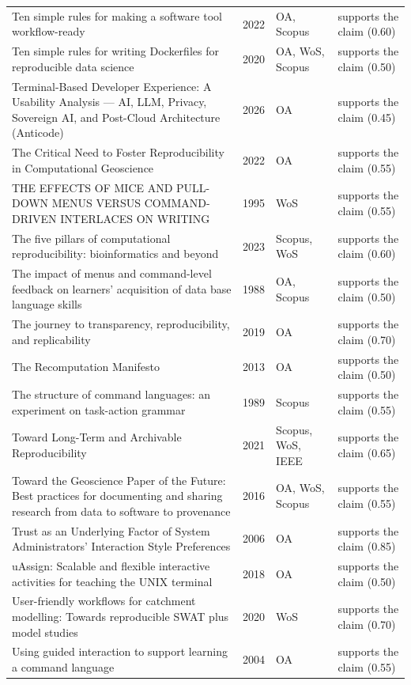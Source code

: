 \begin{longtable}{@{}%
  >{\raggedright\arraybackslash}p{}c%
  >{\raggedright\arraybackslash}p{}%
  >{\raggedright\arraybackslash}p{}@{}}
Ten simple rules for making a software tool workflow-ready & 2022 & OA, Scopus & supports the claim (0.60) \\
Ten simple rules for writing Dockerfiles for reproducible data science & 2020 & OA, WoS, Scopus & supports the claim (0.50) \\
Terminal-Based Developer Experience: A Usability Analysis --- AI, LLM, Privacy, Sovereign AI, and Post-Cloud Architecture (Anticode) & 2026 & OA & supports the claim (0.45) \\
The Critical Need to Foster Reproducibility in Computational Geoscience & 2022 & OA & supports the claim (0.55) \\
THE EFFECTS OF MICE AND PULL-DOWN MENUS VERSUS COMMAND-DRIVEN INTERLACES ON WRITING & 1995 & WoS & supports the claim (0.55) \\
The five pillars of computational reproducibility: bioinformatics and beyond & 2023 & Scopus, WoS & supports the claim (0.60) \\
The impact of menus and command-level feedback on learners' acquisition of data base language skills & 1988 & OA, Scopus & supports the claim (0.50) \\
The journey to transparency, reproducibility, and replicability & 2019 & OA & supports the claim (0.70) \\
The Recomputation Manifesto & 2013 & OA & supports the claim (0.50) \\
The structure of command languages: an experiment on task-action grammar & 1989 & Scopus & supports the claim (0.55) \\
Toward Long-Term and Archivable Reproducibility & 2021 & Scopus, WoS, IEEE & supports the claim (0.65) \\
Toward the Geoscience Paper of the Future: Best practices for documenting and sharing research from data to software to provenance & 2016 & OA, WoS, Scopus & supports the claim (0.55) \\
Trust as an Underlying Factor of System Administrators' Interaction Style Preferences & 2006 & OA & supports the claim (0.85) \\
uAssign: Scalable and flexible interactive activities for teaching the UNIX terminal & 2018 & OA & supports the claim (0.50) \\
User-friendly workflows for catchment modelling: Towards reproducible SWAT plus model studies & 2020 & WoS & supports the claim (0.70) \\
Using guided interaction to support learning a command language & 2004 & OA & supports the claim (0.55) \\

\end{longtable}
